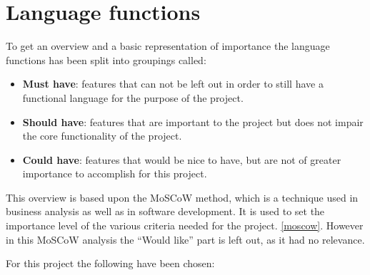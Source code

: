 \section{Language functions}
To get an overview and a basic representation of importance the language functions has been split into groupings called:
\begin{itemize}
\item \textbf{Must have}: features that can not be left out in order to still have a functional language for the purpose of the project.

\item \textbf{Should have}: features that are important to the project but does not impair the core functionality of the project.

\item \textbf{Could have}: features that would be nice to have, but are not of greater importance to accomplish for this project.
\end{itemize}
This overview is based upon the MoSCoW method, which is a technique used in business analysis as well as in software development. It is used to set the importance level of the various criteria needed for the project. \ref{moscow}. However in this MoSCoW analysis the ``Would like'' part is left out, as it had no relevance. 

For this project the following have been chosen:\\

